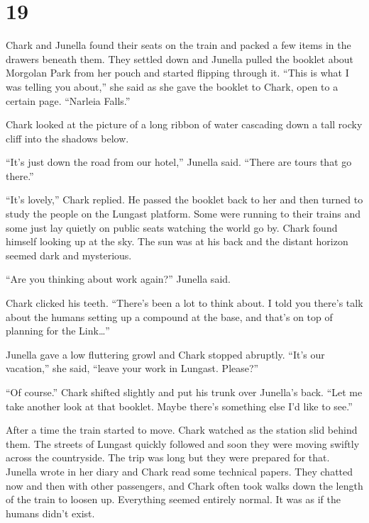 
\chapter{19}

Chark and Junella found their seats on the train and packed a few items in the drawers beneath
them. They settled down and Junella pulled the booklet about Morgolan Park from her pouch and
started flipping through it. ``This is what I was telling you about,'' she said as she gave the
booklet to Chark, open to a certain page. ``Narleia Falls.''

Chark looked at the picture of a long ribbon of water cascading down a tall rocky cliff into the
shadows below.

``It's just down the road from our hotel,'' Junella said. ``There are tours that go there.''

``It's lovely,'' Chark replied. He passed the booklet back to her and then turned to study the
people on the Lungast platform. Some were running to their trains and some just lay quietly on
public seats watching the world go by. Chark found himself looking up at the sky. The sun was at
his back and the distant horizon seemed dark and mysterious.

``Are you thinking about work again?'' Junella said.

Chark clicked his teeth. ``There's been a lot to think about. I told you there's talk about the
humans setting up a compound at the base, and that's on top of planning for the Link\ldots''

Junella gave a low fluttering growl and Chark stopped abruptly. ``It's our vacation,'' she said,
``leave your work in Lungast. Please?''

``Of course.'' Chark shifted slightly and put his trunk over Junella's back. ``Let me take
another look at that booklet. Maybe there's something else I'd like to see.''

After a time the train started to move. Chark watched as the station slid behind them. The
streets of Lungast quickly followed and soon they were moving swiftly across the countryside.
The trip was long but they were prepared for that. Junella wrote in her diary and Chark read
some technical papers. They chatted now and then with other passengers, and Chark often took
walks down the length of the train to loosen up. Everything seemed entirely normal. It was as if
the humans didn't exist.

